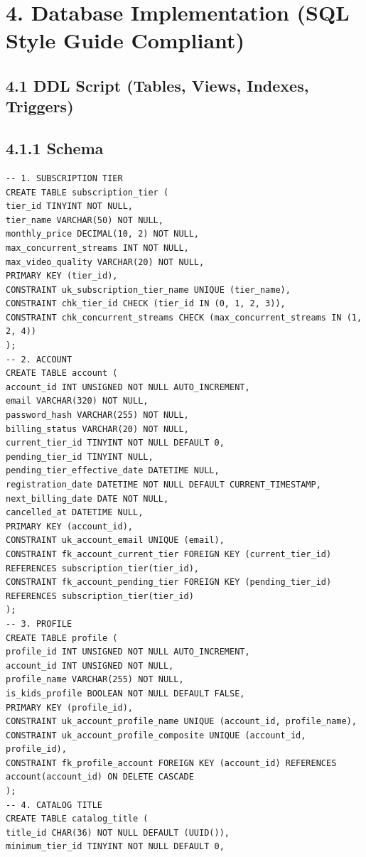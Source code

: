 \section*{4. Database Implementation (SQL Style Guide Compliant)}

\subsection*{4.1 DDL Script (Tables, Views, Indexes, Triggers)}

\subsection*{4.1.1 Schema}

\begin{lstlisting}[style=reportsql,title={Schema DDL}]
-- 1. SUBSCRIPTION TIER
CREATE TABLE subscription_tier (
tier_id TINYINT NOT NULL,
tier_name VARCHAR(50) NOT NULL,
monthly_price DECIMAL(10, 2) NOT NULL,
max_concurrent_streams INT NOT NULL,
max_video_quality VARCHAR(20) NOT NULL,
PRIMARY KEY (tier_id),
CONSTRAINT uk_subscription_tier_name UNIQUE (tier_name),
CONSTRAINT chk_tier_id CHECK (tier_id IN (0, 1, 2, 3)),
CONSTRAINT chk_concurrent_streams CHECK (max_concurrent_streams IN (1, 2, 4))
);
-- 2. ACCOUNT
CREATE TABLE account (
account_id INT UNSIGNED NOT NULL AUTO_INCREMENT,
email VARCHAR(320) NOT NULL,
password_hash VARCHAR(255) NOT NULL,
billing_status VARCHAR(20) NOT NULL,
current_tier_id TINYINT NOT NULL DEFAULT 0,
pending_tier_id TINYINT NULL,
pending_tier_effective_date DATETIME NULL,
registration_date DATETIME NOT NULL DEFAULT CURRENT_TIMESTAMP,
next_billing_date DATE NOT NULL,
cancelled_at DATETIME NULL,
PRIMARY KEY (account_id),
CONSTRAINT uk_account_email UNIQUE (email),
CONSTRAINT fk_account_current_tier FOREIGN KEY (current_tier_id) REFERENCES subscription_tier(tier_id),
CONSTRAINT fk_account_pending_tier FOREIGN KEY (pending_tier_id) REFERENCES subscription_tier(tier_id)
);
-- 3. PROFILE
CREATE TABLE profile (
profile_id INT UNSIGNED NOT NULL AUTO_INCREMENT,
account_id INT UNSIGNED NOT NULL,
profile_name VARCHAR(255) NOT NULL,
is_kids_profile BOOLEAN NOT NULL DEFAULT FALSE,
PRIMARY KEY (profile_id),
CONSTRAINT uk_account_profile_name UNIQUE (account_id, profile_name),
CONSTRAINT uk_account_profile_composite UNIQUE (account_id, profile_id),
CONSTRAINT fk_profile_account FOREIGN KEY (account_id) REFERENCES account(account_id) ON DELETE CASCADE
);
-- 4. CATALOG TITLE
CREATE TABLE catalog_title (
title_id CHAR(36) NOT NULL DEFAULT (UUID()),
minimum_tier_id TINYINT NOT NULL DEFAULT 0,

\end{lstlisting}
